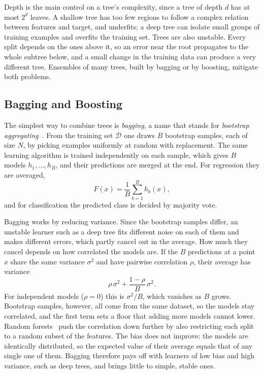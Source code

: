     Depth is the main control on a tree's complexity, since a tree of depth $d$ has
    at most $2^d$ leaves. A shallow tree has too few regions to follow a complex
    relation between features and target, and underfits; a deep tree can
    isolate small groups of training examples and overfits the training set.
    Trees are also unstable. Every split depends on the ones above it, so an
    error near the root propagates to the whole subtree below, and a small
    change in the training data can produce a very different tree. Ensembles of
    many trees, built by bagging or by boosting, mitigate both problems.



\subsection{Bagging and Boosting}
    \label{subsec:bg:gbm:boosting}
    The simplest way to combine trees is \emph{bagging}, a name that stands for
    \emph{bootstrap aggregating}~\cite{breiman1996}. From the training set
    $\mathcal{D}$ one draws $B$ bootstrap samples, each of size $N$, by picking
    examples uniformly at random with replacement. The same learning algorithm is
    trained independently on each sample, which gives $B$ models
    $h_1, \dots, h_B$, and their predictions are merged at the end. For regression
    they are averaged,
    \begin{equation}
    F(x) = \frac{1}{B} \sum_{b=1}^{B} h_b(x),
    \label{eq:bg:gbm:bagging}
    \end{equation}
    and for classification the predicted class is decided by majority
    vote.
    
    Bagging works by reducing variance. Since the bootstrap samples differ, an
    unstable learner such as a deep tree fits different noise on each of them and
    makes different errors, which partly cancel out in the average. How much they
    cancel depends on how correlated the models are. If the $B$ predictions at a
    point $x$ share the same variance $\sigma^2$ and have pairwise correlation
    $\rho$, their average has variance~\cite{hastie2009}
    \begin{equation}
    \rho\, \sigma^{2} + \frac{1 - \rho}{B}\, \sigma^{2}.
    \label{eq:bg:gbm:bagvar}
    \end{equation}
    For independent models ($\rho = 0$) this is $\sigma^2 / B$, which vanishes as
    $B$ grows. Bootstrap samples, however, all come from the same dataset, so the
    models stay correlated, and the first term sets a floor that adding more
    models cannot lower. Random forests~\cite{breiman2001} push the correlation
    down further by also restricting each split to a random subset of the
    features. The bias does not improve: the models are identically distributed,
    so the expected value of their average equals that of any single one of
    them. Bagging therefore pays off with learners of low bias
    and high variance, such as deep trees, and brings little to simple, stable
    ones.
    
